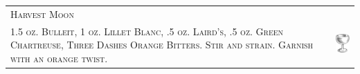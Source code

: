 \documentclass{article}
\begin{document}
\begin{tabular}{b{2.5in} m{0.625in}}
  \multicolumn{2}{p{3.0in}}{\centering\Huge\textsc{Harvest Moon}} \\ 
  
  \textsc{1.5 oz. Bulleit, 1 oz. Lillet Blanc, .5 oz. Laird's, .5 oz.
    Green Chartreuse, Three Dashes Orange Bitters. Stir and
    strain. Garnish with an orange twist.}  &
  \includegraphics[width=0.5in]{coupe.png}
\end{tabular}
\end{document}
